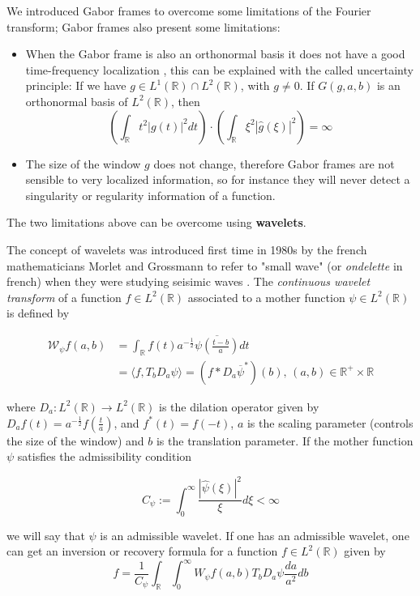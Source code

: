 \bigskip

We introduced Gabor frames to overcome some limitations of the Fourier transform; Gabor frames also present some limitations:
\begin{itemize}
\item When the Gabor frame is also an orthonormal basis it does not have a good time-frequency localization \cite{Gabor}, this can be explained with the called uncertainty principle: If we have $g\in L^1(\mathbb{R})\cap L^2(\mathbb{R})$, with $g\neq 0$. If $G(g,a,b)$ is an orthonormal basis of $L^2(\mathbb{R})$, then
$$
\left(\int_{\mathbb{R}}t^2|g(t)|^2dt\right)\cdot\left(\int_{\mathbb{R}}\xi^2|\hat{g}(\xi)|^2\right)=\infty
$$
\item The size of the window $g$ does not change, therefore Gabor frames are not sensible to very localized information, so for instance they will never detect a singularity or regularity information of a function.
\end{itemize} 
The two limitations above can be overcome using \textbf{wavelets}.

\bigskip 

The concept of wavelets was introduced first time 
in 1980s by the french mathematicians Morlet and Grossmann to refer to "small wave" (or \textit{ondelette} in french) when they were studying seisimic waves \cite{Grossman}. The \textit{continuous wavelet transform} of a function $f\in L^2(\mathbb{R})$ associated to a mother function $\psi\in L^2(\mathbb{R})$ is defined by 

$$
\begin{aligned}
\mathcal{W}_{\psi}f(a,b)&=\int_{\mathbb{R}}f(t)a^{-\frac{1}{2}}\overline{\psi\left(\frac{t-b}{a}\right)}dt\\
&=\langle f, T_bD_a\psi\rangle = (f\ast D_a\overline{\psi}^*)(b)\text{, } (a, b)\in\mathbb{R}^+\times\mathbb{R} 
\end{aligned}
$$

where $D_a:L^2(\mathbb{R})\longrightarrow L^2(\mathbb{R})$ is the dilation operator given by $D_a f(t)=a^{-\frac{1}{2}}f\left(\frac{t}{a}\right)$, and $f^*(t)=f(-t)$, $a$ is the scaling parameter (controls the size of the window) and $b$ is the translation parameter. If the mother function $\psi$ satisfies the admissibility condition 

$$
C_{\psi}:=\int_0^{\infty}\frac{|\hat{\psi}(\xi)|^2}{\xi}d\xi <\infty
$$

we will say that $\psi$ is an admissible wavelet. If one has an admissible wavelet, one can get an inversion or recovery formula for a function $f\in L^2(\mathbb{R})$ given by
$$
f=\frac{1}{C_{\psi}}\int_{\mathbb{R}}\int_0^{\infty} W_{\psi}f(a,b)T_bD_a\psi\frac{da}{a^2}db
$$


